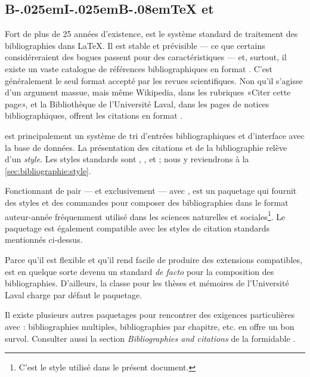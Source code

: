 \subsection[{\BibTeX} et \pkg{natbib}]{%
  {B\kern-.025em{\small I}\kern-.025em{\small  B}\kern-.08em\TeX} %
  et }
\label{sec:bibliographie:systeme:bibtex}

Fort de plus de 25 années d'existence, {\BibTeX}
\citep{bibtex} est le système standard de traitement des
bibliographies dans {\LaTeX}. Il est stable et prévisible --- ce que
certains considéreraient des bogues passent pour des caractéristiques
--- et, surtout, il existe un vaste catalogue de références
bibliographiques en format {\BibTeX}. C'est généralement le seul
format accepté par les revues scientifiques. Non qu'il s'agisse d'un
argument massue, mais même Wikipedia, dans les rubriques «Citer cette
page», et la Bibliothèque de l'Université Laval, dans les pages de
notices bibliographiques, offrent les citations en format {\BibTeX}.

{\BibTeX} est principalement un système de tri d'entrées
bibliographiques et d'interface avec la base de données. La
présentation des citations et de la bibliographie relève d'un
\emph{style}. Les styles standards sont , ,
 et ; nous y reviendrons à la
\autoref{sec:bibliographie:style}.

Fonctionnant de pair --- et exclusivement --- avec {\BibTeX},
 \citep{natbib} est un paquetage qui fournit des styles et
des commandes pour composer des bibliographies dans le format
auteur-année fréquemment utilisé dans les sciences naturelles et
sociales\footnote{%
  C'est le style utilisé dans le présent document.}. %
Le paquetage est également compatible avec les styles de citation
standards mentionnés ci-dessus.

Parce qu'il est flexible et qu'il rend facile de produire des
extensions compatibles,  est en quelque sorte devenu un
standard \emph{de facto} pour la composition des bibliographies.
D'ailleurs, la classe  pour les thèses et mémoires de
l'Université Laval charge par défaut le paquetage.

Il existe plusieurs autres paquetages pour rencontrer des exigences
particulières avec {\BibTeX}: bibliographies multiples, bibliographies
par chapitre, etc. \citet{Mori:bibliographies:2009} en offre un bon
survol. Consulter aussi la section \emph{Bibliographies and citations}
de la formidable %
.


